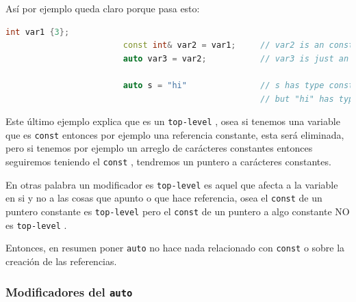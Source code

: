 \documentclass[12pt, fleqn]{report}                             %
\theoremstyle{break}                                            %
\newcommand{\textCode}[1]  { \texttt{#1} }                      %
\begin{document}
                    Así por ejemplo queda claro porque pasa esto:
                    \begin{lstlisting}[language=C++, gobble=24]
                        int var1 {3};
                        const int& var2 = var1;     // var2 is an const int&
                        auto var3 = var2;           // var3 is just an int

                        auto s = "hi"               // s has type const char*
                                                    // but "hi" has type const char[3]
                    \end{lstlisting}

                    Este último ejemplo explica que es un \textCode{top-level}, osea si tenemos una variable
                    que es \textCode{const} entonces por ejemplo una referencia constante, esta será eliminada, 
                    pero si tenemos por ejemplo un arreglo de carácteres constantes entonces seguiremos teniendo
                    el \textCode{const}, tendremos un puntero a carácteres constantes.

                    En otras palabra un modificador es \textCode{top-level} es aquel que afecta a la variable
                    en si y no a las cosas que apunto o que hace referencia, osea el \textCode{const}
                    de un puntero constante es \textCode{top-level} pero el \textCode{const} de un puntero a 
                    algo constante NO es \textCode{top-level}.
                
                \clearpage

                Entonces, en resumen poner \textCode{auto} no hace nada relacionado con \textCode{const} o 
                sobre la creación de las referencias.

                \subsubsection{Modificadores del \textCode{auto}} 
\end{document}
